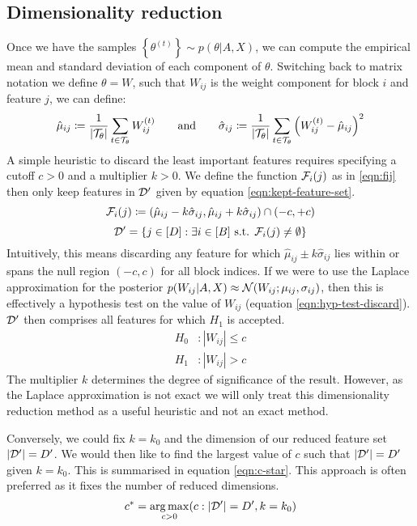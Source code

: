 \subsection{Dimensionality reduction}
\label{sec:dim-reduction}

Once we have the samples $\left\{ \theta^{(t)} \right\} \sim p(\theta | A, X)$, we can compute the empirical mean and standard deviation of each component of $\theta$. Switching back to matrix notation we define $\theta = W$, such that $W_{ij}$ is the weight component for block $i$ and feature $j$, we can define:
%
\begin{equation}
	\hat{\mu}_{ij} \coloneqq \frac{1}{|\mathcal{T}_\theta|} \sum_{t \in \mathcal{T}_\theta} W_{ij}^{(t)} \qquad \textrm{and} \qquad
	\hat{\sigma}_{ij} \coloneqq \frac{1}{|\mathcal{T}_\theta|} \sum_{t \in \mathcal{T}_\theta} \left( W_{ij}^{(t)} - \hat{\mu}_{ij} \right)^2
\end{equation}
%
A simple heuristic to discard the least important features requires specifying a cutoff $c > 0$ and a multiplier $k > 0$. We define the function $\mathcal{F}_i(j)$ as in \ref{eqn:fij} then only keep features in $\mathcal{D}'$ given by equation \ref{eqn:kept-feature-set}.
%
\begin{equation}
	\mathcal{F}_i(j) \coloneqq (\hat{\mu}_{ij} - k \hat{\sigma}_{ij}, \hat{\mu}_{ij} + k \hat{\sigma}_{ij}) \cap (-c, +c)
	\label{eqn:fij}
\end{equation}
\begin{equation}
	\mathcal{D}' = \left\{ j \in [D] : \exists i \in [B] \textrm{ s.t. }  \mathcal{F}_i(j) \neq \emptyset \right\}
	\label{eqn:kept-feature-set}
\end{equation}
%
Intuitively, this means discarding any feature for which $\hat{\mu}_{ij} \pm k\hat{\sigma}_{ij}$ lies within or spans the null region $(-c, c)$ for all block indices. If we were to use the Laplace approximation for the posterior $p(W_{ij} | A, X) \approx \mathcal{N}(W_{ij}; \mu_{ij}, \sigma_{ij})$, then this is effectively a hypothesis test on the value of $W_{ij}$ (equation \ref{eqn:hyp-test-discard}). $\mathcal{D}'$ then comprises all features for which $H_1$ is accepted.
%
\begin{equation}
	\begin{aligned}
		H_0&: |W_{ij}| \leq c \\
		H_1&: |W_{ij}| > c
	\end{aligned}
	\label{eqn:hyp-test-discard}
\end{equation}
%
The multiplier $k$ determines the degree of significance of the result. However, as the Laplace approximation is not exact we will only treat this dimensionality reduction method as a useful heuristic and not an exact method.

Conversely, we could fix $k=k_0$ and the dimension of our reduced feature set $|\mathcal{D}'|=D'$. We would then like to find the largest value of $c$ such that $|\mathcal{D}'|=D'$ given $k=k_0$. This is summarised in equation \ref{eqn:c-star}. This approach is often preferred as it fixes the number of reduced dimensions.
%
\begin{equation}
	c^* = \operatorname*{arg\,max}_{c>0} (c : |\mathcal{D}'| = D', k=k_0)
	\label{eqn:c-star}
\end{equation}
%